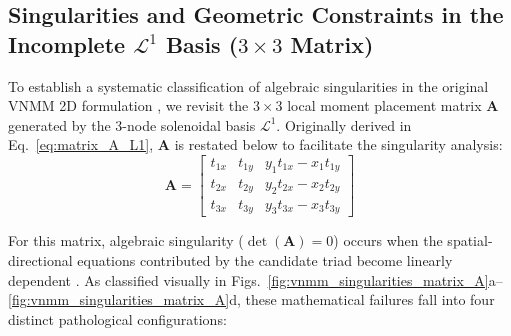 \documentclass[preprint,12pt]{elsarticle}
\begin{document}
\subsection{Singularities and Geometric Constraints in the Incomplete $\mathcal{L}^1$ Basis ($3 \times 3$ Matrix)}
\label{subsec:singularities_L1}

To establish a systematic classification of algebraic singularities in the original VNMM 2D formulation \cite{ortiz2021nodal, ortiz2023tese}, we revisit the $3 \times 3$ local moment placement matrix $\mathbf{A}$ generated by the 3-node solenoidal basis $\mathcal{L}^1$. Originally derived in Eq.~\eqref{eq:matrix_A_L1}, $\mathbf{A}$ is restated below to facilitate the singularity analysis:
\begin{equation}
\mathbf{A} = \begin{bmatrix}
t_{1x} & t_{1y} & y_1 t_{1x} - x_1 t_{1y} \\[4pt]
t_{2x} & t_{2y} & y_2 t_{2x} - x_2 t_{2y} \\[4pt]
t_{3x} & t_{3y} & y_3 t_{3x} - x_3 t_{3y}
\end{bmatrix}
\label{eq:matrix_A_L1_revisited}
\end{equation}

For this matrix, algebraic singularity ($\det(\mathbf{A}) = 0$) occurs when the spatial-directional equations contributed by the candidate triad become linearly dependent \cite{ortiz2023tese, goncalves2025tese}. As classified visually in Figs.~\ref{fig:vnmm_singularities_matrix_A}a--\ref{fig:vnmm_singularities_matrix_A}d, these mathematical failures fall into four distinct pathological configurations:
\end{document}
